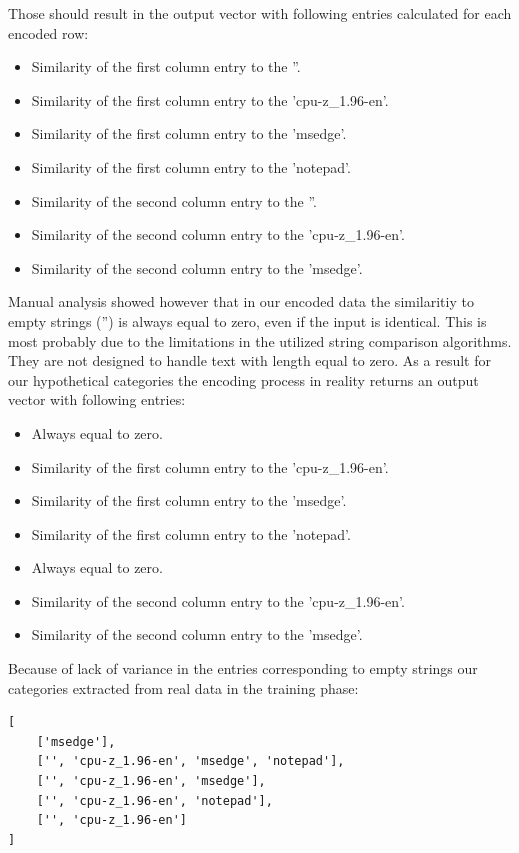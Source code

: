 \documentclass[a4paper,twoside,12pt]{book}
\begin{document}
Those should result in the output vector with following entries calculated for each encoded row:

\begin{itemize}
	\item Similarity of the first column entry to the ''.
	\item Similarity of the first column entry to the 'cpu-z\_1.96-en'.
	\item Similarity of the first column entry to the 'msedge'.
	\item Similarity of the first column entry to the 'notepad'.
	\item Similarity of the second column entry to the ''.
	\item Similarity of the second column entry to the 'cpu-z\_1.96-en'.
	\item Similarity of the second column entry to the 'msedge'.
\end{itemize}

Manual analysis showed however that in our encoded data the similaritiy to empty strings ('') is 
always equal to zero, even if the input is identical. This is most probably due to the limitations 
in the utilized string comparison algorithms. They are not designed to handle text with length equal to zero.
As a result for our hypothetical categories the encoding process in reality returns an output vector with 
following entries:
\begin{itemize}
	\item Always equal to zero.
	\item Similarity of the first column entry to the 'cpu-z\_1.96-en'.
	\item Similarity of the first column entry to the 'msedge'.
	\item Similarity of the first column entry to the 'notepad'.
	\item Always equal to zero.
	\item Similarity of the second column entry to the 'cpu-z\_1.96-en'.
	\item Similarity of the second column entry to the 'msedge'.
\end{itemize}

Because of lack of variance in the entries corresponding to empty strings our categories extracted 
from real data in the training phase:
\begin{lstlisting}
[
	['msedge'],
	['', 'cpu-z_1.96-en', 'msedge', 'notepad'],
 	['', 'cpu-z_1.96-en', 'msedge'],
	['', 'cpu-z_1.96-en', 'notepad'],
 	['', 'cpu-z_1.96-en']
]
\end{lstlisting}
\end{document}
